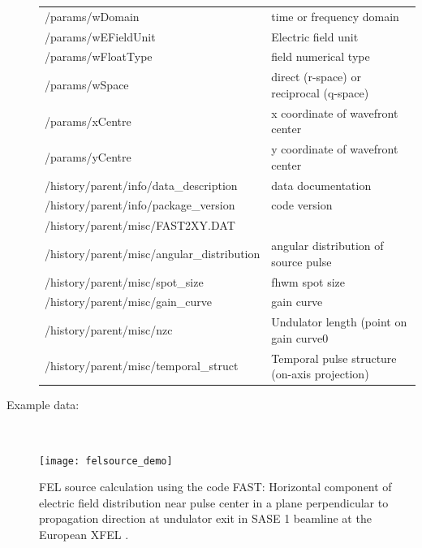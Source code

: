\documentclass[12pt]{scrartcl}
\begin{document}
\begin{description}
{\begin{tabular}{l|l}
      /params/wDomain     & time or frequency domain\\
      /params/wEFieldUnit     & Electric field unit \\
      /params/wFloatType    &  field numerical type \\
      /params/wSpace      &  direct (r-space) or reciprocal (q-space)\\
      /params/xCentre     & x coordinate of wavefront center \\
      /params/yCentre     & y coordinate of wavefront center \\
      /history/parent/info/data\_description     & data documentation \\
      /history/parent/info/package\_version    & code version \\
      /history/parent/misc/FAST2XY.DAT    &  \\
      /history/parent/misc/angular\_distribution     & angular distribution of source pulse \\
      /history/parent/misc/spot\_size    & fhwm spot size \\
      /history/parent/misc/gain\_curve     & gain curve \\
      /history/parent/misc/nzc    & Undulator length (point on gain curve0 \\
      /history/parent/misc/temporal\_struct    & Temporal pulse structure (on-axis projection) \\
      \hline
      \hline
    \end{tabular}
      }
    \item[Example data:]\ \\[2ex]
        \begin{center}
          \texttt{[image: felsource\_demo]}
        \end{center}
        \scriptsize{FEL source calculation using the code FAST: Horizontal
        component of electric field distribution near pulse center in a plane perpendicular to
      propagation direction at undulator exit in SASE 1 beamline at the European
      XFEL \cite{xpd_xfel}.}
    \end{description}

%
\end{document}
